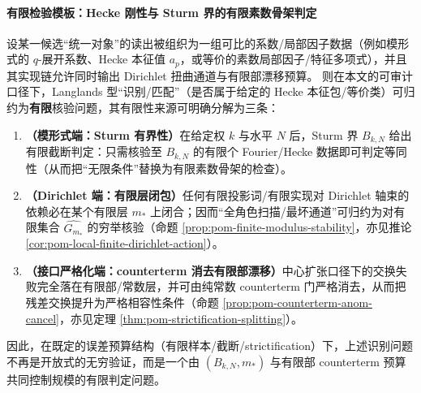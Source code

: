 \paragraph{有限检验模板：Hecke 刚性与 Sturm 界的有限素数骨架判定}
\begin{theorem}\label{thm:audit-finite-decidability-sturm-finite-layer}
设某一候选“统一对象”的读出被组织为一组可比的系数/局部因子数据（例如模形式的 \(q\)-展开系数、Hecke 本征值 \(a_p\)，或等价的素数局部因子/特征多项式），并且其实现链允许同时输出 Dirichlet 扭曲通道与有限部漂移预算。
则在本文的可审计口径下，Langlands 型“识别/匹配”（是否属于给定的 Hecke 本征包/等价类）可归约为\textbf{有限}核验问题，其有限性来源可明确分解为三条：
\begin{enumerate}
  \item \textbf{（模形式端：Sturm 有界性）}在给定权 \(k\) 与水平 \(N\) 后，Sturm 界 \(B_{k,N}\) 给出有限截断判定：只需核验至 \(B_{k,N}\) 的有限个 Fourier/Hecke 数据即可判定等同性（从而把“无限条件”替换为有限素数骨架的检查）。
  \item \textbf{（Dirichlet 端：有限层闭包）}任何有限投影词/有限实现对 Dirichlet 轴束的依赖必在某个有限层 \(m_\ast\) 上闭合；因而“全角色扫描/最坏通道”可归约为对有限集合 \(\widehat{G_{m_\ast}}\) 的穷举核验（命题 \ref{prop:pom-finite-modulus-stability}，亦见推论 \ref{cor:pom-local-finite-dirichlet-action}）。
  \item \textbf{（接口严格化端：counterterm 消去有限部漂移）}中心扩张口径下的交换失败完全落在有限部/常数层，并可由纯常数 counterterm 门严格消去，从而把残差交换提升为严格相容性条件（命题 \ref{prop:pom-counterterm-anom-cancel}，亦见定理 \ref{thm:pom-strictification-splitting}）。
\end{enumerate}
因此，在既定的误差预算结构（有限样本/截断/strictification）下，上述识别问题不再是开放式的无穷验证，而是一个由 \((B_{k,N},m_\ast)\) 与有限部 counterterm 预算共同控制规模的有限判定问题。
\end{theorem}

